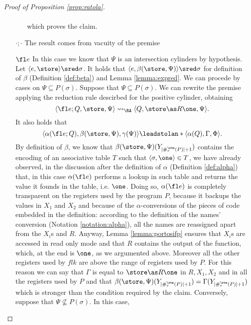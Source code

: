 \begin{proof}[Proof of Proposition \ref{prop:ratola}]
\begin{itemize}
\begin{itemize}
$$\begin{gathered}
          \end{gathered}
          $$
          which proves the claim.
    \end{itemize}
    \item[$\cdot;\cdot$] The result comes from vacuity of the premise
    \item[$\fl e$] In this case we know that $\Psi$ is an intersection cylinders
     by hypothesis. Let $\langle e, \store\rangle \sred \sigma$. It holds that $\langle e, \beta(\store, \Psi)\rangle \sred \sigma$ for definition of $\beta$ (Definition \ref{def:beta}) and
     Lemma \ref{lemma:expred}. We can procede by cases on $\Psi\subseteq P(\sigma)$.
    Suppose that $\Psi \subseteq P(\sigma)$. We can rewrite the premise applying
    the reduction rule descirbed for the positive cylinder, obtaining
     $$
     \langle \fl e;Q, \store, \Psi\rangle \leadsto_\RA \langle Q, \store\as R \one, \Psi\rangle.
     $$
     It also holds that
     $$
     \langle \alpha(\fl e;Q), \beta(\store, \Psi), \gamma(\Psi)\rangle \leadstolan * \langle \alpha(Q), \Gamma, \Phi\rangle.
     $$
     By definition of $\beta$, we know that $\beta(\store, \Psi)({Y_{|\#_r^\stm(P)|+1}})$
     contains the encoding of an associative table $T$ such that
     $\langle \sigma, \one\rangle \in T$, we have already observed, in the discussion
     after the definition of $\alpha$ (Definition \ref{def:alpha}) that, in this case
     $\alpha(\fl e)$ performs a lookup in such table and returns the value it founds
     in the table, i.e. $\one$. Doing so, $\alpha(\fl e)$ is completely transparent
     on the registers used by the program $P$, because it backups the values in
     $X_1$ and $X_2$ and because of the $\alpha$-conversions of the pieces of
     code embedded in the definition: according to the definition of the names'
     conversion (Notation \ref{notation:alpha}), all the names
     are reassigned apart from the $X_i$s and $R$. Anyway, Lemma
     \ref{lemma:portosifp} ensures that $X_i$s are accessed in read only mode
     and that $R$ contains the output of the function, which, at the end is $\one$,
     as  we argumented above. Moreover all the other registers used by $\mathit{fl} k$
     are above the range of registers used by $P$.
     For this reason we can say that $\Gamma$ is
     equal to $\store\as R \one$ in $R, X_1, X_2$ and in all the registers used
     by $P$ and that
     $\beta(\store, \Psi)({Y_{|\#_r^\stm(P)|+1}})=\Gamma({Y_{|\#_r^\stm(P)|+1}})$
     which is stronger than the condition required by the claim.
     Conversely, suppose that $\Psi \not\subseteq P(\sigma)$. In this case,

\end{itemize}
\end{proof}
